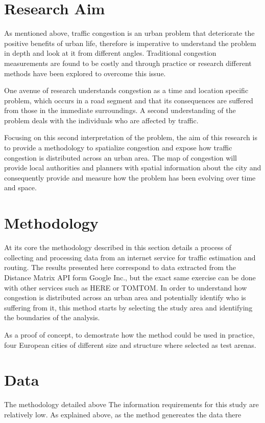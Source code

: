\documentclass[a4paper]{jpconf}
\begin{document}
\section{Research Aim}
\indent As mentioned above, traffic congestion is an urban problem that deteriorate the positive benefits of urban life, therefore is imperative to understand the problem in depth and look at it from different angles. Traditional congestion measurements are found to be costly and through practice or research different methods have been explored to overcome this issue. \par
\indent One avenue of research understands congestion as a time and location specific problem, which occurs in a road segment and that its consequences are suffered from those in the immediate surroundings. A second understanding of the problem deals with the individuals who are affected by traffic. \par
\indent Focusing on this second interpretation of the problem, the aim of this research is to provide a methodology to spatialize congestion and expose how traffic congestion is distributed across an urban area. The map of congestion will provide local authorities and planners with spatial information about the city and consequently provide and measure how the problem has been evolving over time and space.  \par



\section{Methodology}
At its core the methodology described in this section details a process of collecting and processing data from an internet service for traffic estimation and routing. The results presented here correspond to data extracted from the Distance Matrix API form Google Inc., but the exact same exercise can be done with other services such as HERE or TOMTOM.
In order to understand how congestion is distributed across an urban area and potentially identify who is suffering from it, this method starts by selecting the study area and identifying the boundaries of the analysis. 



As a proof of concept, to demostrate how the method could be used in practice, four European cities of different size and structure where selected as test arenas.  \par


\section{Data}
\indent The methodology detailed above The information requirements for this study are relatively low. As explained above, as the method genereates the data there 
\end{document}
